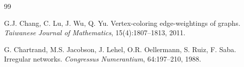 \documentclass[a4paper,11pt,dvipsnames]{elsarticle}
\begin{document}
\begin{thebibliography}{99}











 G.J. Chang, C. Lu, J. Wu, Q. Yu. Vertex-coloring edge-weightings of graphs. \textit{Taiwanese Journal of Mathematics}, 15(4):1807--1813, 2011.


 G. Chartrand, M.S. Jacobson, J. Lehel, O.R. Oellermann, S. Ruiz, F. Saba. Irregular networks. \textit{Congressus Numerantium}, 64:197--210, 1988.


\end{thebibliography}
\end{document}
